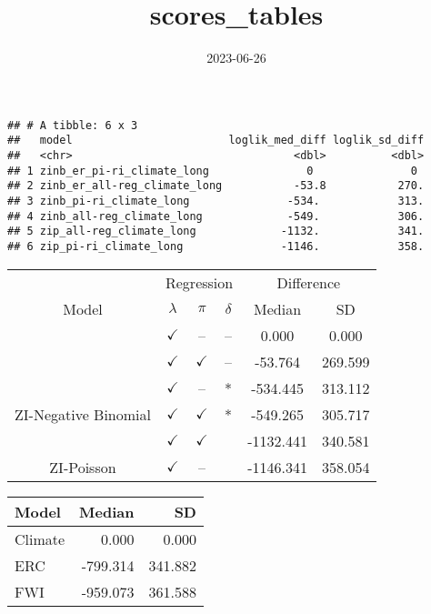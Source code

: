 \documentclass[
]{article}
\title{scores\_tables}
\author{}
\date{\vspace{-2.5em}2023-06-26}
\begin{document}
\maketitle

\begin{verbatim}
## # A tibble: 6 x 3
##   model                        loglik_med_diff loglik_sd_diff
##   <chr>                                  <dbl>          <dbl>
## 1 zinb_er_pi-ri_climate_long               0               0 
## 2 zinb_er_all-reg_climate_long           -53.8           270.
## 3 zinb_pi-ri_climate_long               -534.            313.
## 4 zinb_all-reg_climate_long             -549.            306.
## 5 zip_all-reg_climate_long             -1132.            341.
## 6 zip_pi-ri_climate_long               -1146.            358.
\end{verbatim}

\begin{tabular}{cccccc}
\toprule
\multicolumn{1}{c}{ } & \multicolumn{3}{c}{Regression} & \multicolumn{2}{c}{Difference} \\
\cmidrule(l{3pt}r{3pt}){2-4} \cmidrule(l{3pt}r{3pt}){5-6}
Model & $\lambda$ & $\pi$ & $\delta$ & Median & SD\\
\midrule
 & $\checkmark$ & -- & -- & 0.000 & 0.000\\

 & $\checkmark$ & $\checkmark$ & -- & -53.764 & 269.599\\

 & $\checkmark$ & -- & * & -534.445 & 313.112\\

\multirow{-4}{*}{\centering\arraybackslash ZI-Negative Binomial} & $\checkmark$ & $\checkmark$ & * & -549.265 & 305.717\\
\cmidrule{1-6}
 & $\checkmark$ & $\checkmark$ &  & -1132.441 & 340.581\\

\multirow{-2}{*}{\centering\arraybackslash ZI-Poisson} & $\checkmark$ & -- &  & -1146.341 & 358.054\\
\bottomrule
\end{tabular}

\begin{tabular}{lrr}
\toprule
Model & Median & SD\\
\midrule
Climate & 0.000 & 0.000\\
ERC & -799.314 & 341.882\\
FWI & -959.073 & 361.588\\
\bottomrule
\end{tabular}
\end{document}
